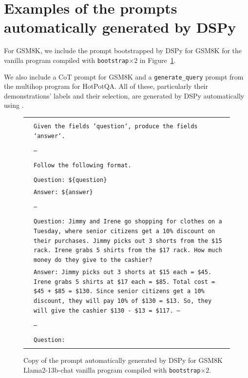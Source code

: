 \clearpage
\section{Examples of the prompts automatically generated by DSPy}\label{sec:dspy_prompt_examples}


For GSM8K, we include the prompt bootstrapped by DSPy for GSM8K \llamaThirteenChat{} for the vanilla program compiled with \texttt{bootstrap}$\times2$ in Figure~\ref{fig:gms8k_bootstrap2}.

We also include a CoT prompt for GSM8K and a \texttt{generate\_query} prompt from the multihop program for HotPotQA. All of these, particularly their demonstrations' labels and their selection, are generated by DSPy automatically using \llamaThirteenChat{}.


{ %

\newcommand{\pWidth}{5in}
\newcommand{\pStart}{\setcounter{pCount}{1}}
\newcommand{\pRow}[1]{\texttt{\fontsize{6pt}{1pt}\selectfont\color{gray}\arabic{pCount}}&\texttt{\fontsize{6pt}{1pt}\selectfont#1}\stepcounter{pCount}\\}
\newcommand{\pVar}[1]{\textbf{\{#1\}}}
\newcommand{\pBlank}{\_\_\_\_\_}
\begin{figure}[p]
\begin{center}\scriptsize
\begin{tabular}{|rp{\pWidth}|}\hline\pStart&\\
\pRow{Given the fields `question`, produce the fields `answer`.}
\pRow{}
\pRow{---}
\pRow{}
\pRow{Follow the following format.}
\pRow{}
\pRow{Question: \$\{question\}}
\pRow{Answer: \$\{answer\}}
\pRow{}
\pRow{---}
\pRow{}
\pRow{Question: Jimmy and Irene go shopping for clothes on a Tuesday, where senior citizens get a 10\% discount on their purchases. Jimmy picks out 3 shorts from the \$15 rack. Irene grabs 5 shirts from the \$17 rack. How much money do they give to the cashier?}
\pRow{Answer: Jimmy picks out 3 shorts at \$15 each = \$45. Irene grabs 5 shirts at \$17 each = \$85. Total cost = \$45 + \$85 = \$130. Since senior citizens get a 10\% discount, they will pay 10\% of \$130 = \$13. So, they will give the cashier \$130 - \$13 = \$117. ---}
\pRow{}
\pRow{---}
\pRow{}
\pRow{Question:}
&\\\hline\end{tabular}
\caption{Copy of the prompt automatically generated by DSPy for GSM8K Llama2-13b-chat vanilla program compiled with \texttt{bootstrap}$\times2$.}
\label{fig:gms8k_bootstrap2}
\end{center}
\end{figure}

} %




